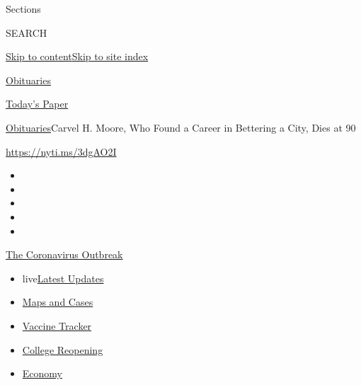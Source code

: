 Sections

SEARCH

\protect\hyperlink{site-content}{Skip to
content}\protect\hyperlink{site-index}{Skip to site index}

\href{https://www.nytimes.com/section/obituaries}{Obituaries}

\href{https://myaccount.nytimes.com/auth/login?response_type=cookie\&client_id=vi}{}

\href{https://www.nytimes.com/section/todayspaper}{Today's Paper}

\href{/section/obituaries}{Obituaries}\textbar{}Carvel H. Moore, Who
Found a Career in Bettering a City, Dies at 90

\url{https://nyti.ms/3dgAO2I}

\begin{itemize}
\item
\item
\item
\item
\item
\end{itemize}

\href{https://www.nytimes.com/news-event/coronavirus?action=click\&pgtype=Article\&state=default\&region=TOP_BANNER\&context=storylines_menu}{The
Coronavirus Outbreak}

\begin{itemize}
\tightlist
\item
  live\href{https://www.nytimes.com/2020/08/03/world/coronavirus-covid-19.html?action=click\&pgtype=Article\&state=default\&region=TOP_BANNER\&context=storylines_menu}{Latest
  Updates}
\item
  \href{https://www.nytimes.com/interactive/2020/us/coronavirus-us-cases.html?action=click\&pgtype=Article\&state=default\&region=TOP_BANNER\&context=storylines_menu}{Maps
  and Cases}
\item
  \href{https://www.nytimes.com/interactive/2020/science/coronavirus-vaccine-tracker.html?action=click\&pgtype=Article\&state=default\&region=TOP_BANNER\&context=storylines_menu}{Vaccine
  Tracker}
\item
  \href{https://www.nytimes.com/2020/08/02/us/covid-college-reopening.html?action=click\&pgtype=Article\&state=default\&region=TOP_BANNER\&context=storylines_menu}{College
  Reopening}
\item
  \href{https://www.nytimes.com/live/2020/08/03/business/stock-market-today-coronavirus?action=click\&pgtype=Article\&state=default\&region=TOP_BANNER\&context=storylines_menu}{Economy}
\end{itemize}

